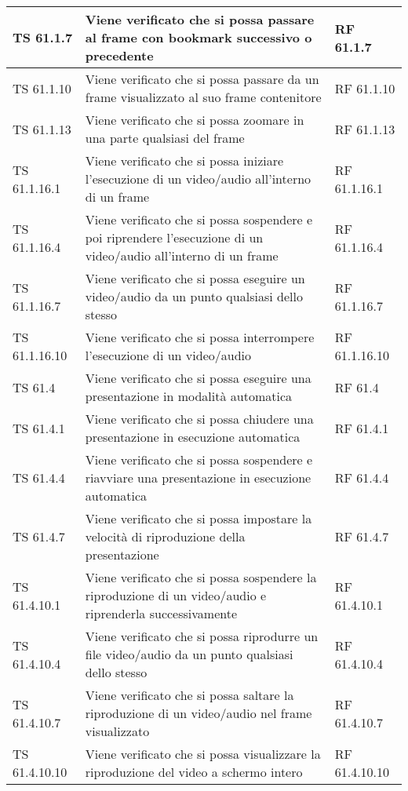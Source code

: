 {{\begin{longtable} [c]{| p{3cm} | p{6cm} |p{3cm}|}
			\hline
			TS 61.1.7 & Viene verificato che si possa passare al frame\ped{g} con bookmark\ped{g} successivo o precedente & RF 61.1.7\\
			\hline
			TS 61.1.10 & Viene verificato che si possa passare da un frame\ped{g} visualizzato al suo frame\ped{g} contenitore & RF 61.1.10\\
			\hline
			TS 61.1.13 & Viene verificato che si possa zoomare in una parte qualsiasi del frame\ped{g} & RF 61.1.13\\
			\hline
			TS 61.1.16.1 & Viene verificato che si possa iniziare l’esecuzione di un video/audio all'interno di un frame\ped{g} & RF 61.1.16.1\\
			\hline
			TS 61.1.16.4 & Viene verificato che si possa sospendere\ped{g} e poi riprendere l'esecuzione di un video/audio all'interno di un frame\ped{g} & RF 61.1.16.4\\
			\hline
			TS 61.1.16.7 & Viene verificato che si possa eseguire un video/audio da un punto qualsiasi dello stesso & RF 61.1.16.7\\
			\hline
			TS 61.1.16.10 & Viene verificato che si possa interrompere l'esecuzione di un video/audio & RF 61.1.16.10\\
			\hline
			TS 61.4 & Viene verificato che si possa eseguire una presentazione in modalità automatica & RF 61.4\\
			\hline
			TS 61.4.1 & Viene verificato che si possa chiudere una presentazione in esecuzione automatica & RF 61.4.1\\
			\hline
			TS 61.4.4 & Viene verificato che si possa sospendere\ped{g} e riavviare una presentazione in esecuzione automatica & RF 61.4.4\\
			\hline
			TS 61.4.7 & Viene verificato che si possa impostare la velocità di riproduzione della presentazione & RF 61.4.7\\
			\hline
			TS 61.4.10.1 & Viene verificato che si possa sospendere la riproduzione di un video/audio e riprenderla successivamente & RF 61.4.10.1\\
			\hline
			TS 61.4.10.4 & Viene verificato che si possa riprodurre un file video/audio da un punto qualsiasi dello stesso & RF 61.4.10.4\\
			\hline
			TS 61.4.10.7 & Viene verificato che si possa saltare la riproduzione di un video/audio nel frame\ped{g} visualizzato & RF 61.4.10.7\\
			\hline
			TS 61.4.10.10 & Viene verificato che si possa visualizzare la riproduzione del video a schermo intero & RF 61.4.10.10\\

\end{longtable}}}
